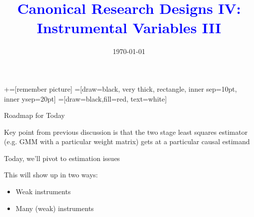 \documentclass[notes,11pt, aspectratio=169]{beamer}
\title[]{\textcolor{blue}{Canonical Research Designs IV:\\ Instrumental Variables III }}
\author[PGP]{}
\institute[FRBNY]{\small{\begin{tabular}{c}
  Paul Goldsmith-Pinkham  \\
\end{tabular}}}
\date{\today}
\newenvironment{wideitemize}{\itemize\addtolength{\itemsep}{10pt}}{\enditemize}
\begin{document}
\newcommand\marktopleft[1]{%
    \tikz[overlay,remember picture] 
        \node (marker-#1-a) at (-.3em,.3em) {};%
}
\newcommand\markbottomright[2]{%
    \tikz[overlay,remember picture] 
        \node (marker-#1-b) at (0em,0em) {};%
}
+=[remember picture] 
 =[draw=black, very thick, rectangle, inner sep=10pt, inner ysep=20pt]
 =[draw=black,fill=red, text=white]

\begin{frame}
\maketitle
\end{frame}

\begin{frame}{Roadmap for Today}
  \begin{wideitemize}
    \item Key point from previous discussion is that the two stage
      least squares estimator (e.g. GMM with a particular weight
      matrix) gets at a particular causal estimand
    \item Today, we'll pivot to estimation issues
    \item This will show up in two ways:
      \begin{itemize}
      \item Weak instruments
      \item Many (weak) instruments
      \end{itemize}
  \end{wideitemize}
\end{frame}
\end{document}

